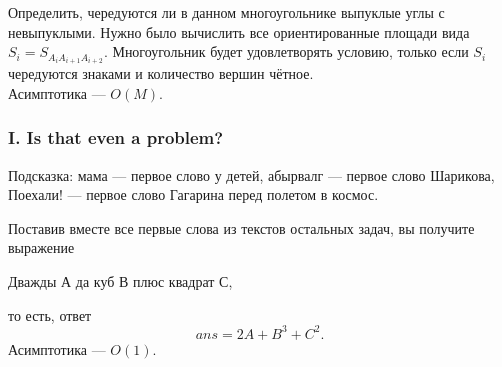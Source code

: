 Определить, чередуются ли в данном многоугольнике выпуклые углы с невыпуклыми. Нужно было вычислить все ориентированные площади вида $S_i = S_{A_iA_{i+1}A_{i+2}}$. Многоугольник будет удовлетворять условию, только если $S_i$ чередуются знаками и количество вершин чётное.\\
Асимптотика --- $O(M)$.


\subsubsection*{I. Is that even a problem?}

Подсказка: мама --- первое слово у детей, абырвалг --- первое слово Шарикова, Поехали! --- первое слово Гагарина перед полетом в космос.

Поставив вместе все первые слова из текстов остальных задач, вы получите выражение
\begin{center}
Дважды А да куб В плюс квадрат С,
\end{center}
то есть, ответ
$$
ans = 2A+B^3+C^2.
$$
Асимптотика --- $O(1)$.